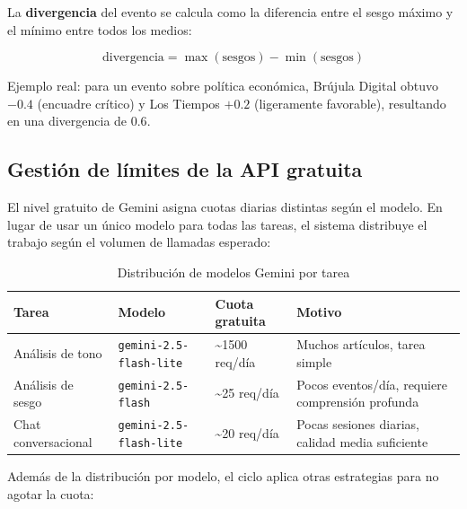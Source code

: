 \documentclass[12pt,a4paper]{article}
\begin{document}
La \textbf{divergencia} del evento se calcula como la diferencia entre el sesgo máximo y el mínimo entre todos los medios:

\begin{equation}
  \text{divergencia} = \max(\text{sesgos}) - \min(\text{sesgos})
\end{equation}

Ejemplo real: para un evento sobre política económica, Brújula Digital obtuvo $-0.4$ (encuadre crítico) y Los Tiempos $+0.2$ (ligeramente favorable), resultando en una divergencia de $0.6$.

\subsection{Gestión de límites de la API gratuita}

El nivel gratuito de Gemini asigna cuotas diarias distintas según el modelo. En lugar de usar un único modelo para todas las tareas, el sistema distribuye el trabajo según el volumen de llamadas esperado:

\begin{table}[H]
\centering
\caption{Distribución de modelos Gemini por tarea}
\begin{tabular}{@{}llll@{}}
\toprule
\rowcolor{azulAS!15}
\textbf{Tarea} & \textbf{Modelo} & \textbf{Cuota gratuita} & \textbf{Motivo} \\
\midrule
Análisis de tono & \texttt{gemini-2.5-flash-lite} & \textasciitilde{}1500 req/día & Muchos artículos, tarea simple \\
\rowcolor{grisCelda}
Análisis de sesgo & \texttt{gemini-2.5-flash} & \textasciitilde{}25 req/día & Pocos eventos/día, requiere comprensión profunda \\
Chat conversacional & \texttt{gemini-2.5-flash-lite} & \textasciitilde{}20 req/día & Pocas sesiones diarias, calidad media suficiente \\
\bottomrule
\end{tabular}
\label{tab:modelos_gemini}
\end{table}

Además de la distribución por modelo, el ciclo aplica otras estrategias para no agotar la cuota:
\end{document}
